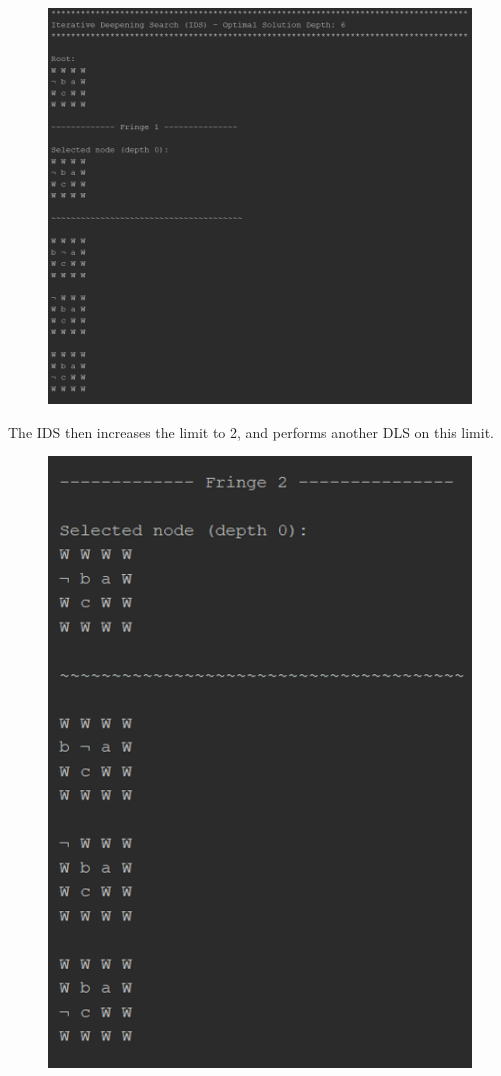 \documentclass{article}
\begin{document}
	\begin{figure}[h]
		\centering
		\includegraphics[height=0.7\textheight]{IDS-1-1.png}
	\end{figure}

	\newpage
	The IDS then increases the limit to 2, and performs another DLS on this limit.
	
	\begin{figure}[h]
		\centering
		\includegraphics[height=0.7\textheight]{IDS-1-2.png}
	\end{figure}
\end{document}
